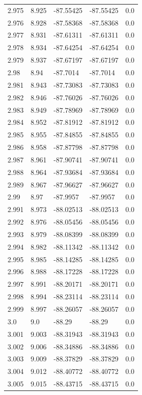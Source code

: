 \begin{tabular}{lllll}
2.975 & 8.925 & -87.55425 & -87.55425 & 0.0 \\
2.976 & 8.928 & -87.58368 & -87.58368 & 0.0 \\
2.977 & 8.931 & -87.61311 & -87.61311 & 0.0 \\
2.978 & 8.934 & -87.64254 & -87.64254 & 0.0 \\
2.979 & 8.937 & -87.67197 & -87.67197 & 0.0 \\
2.98 & 8.94 & -87.7014 & -87.7014 & 0.0 \\
2.981 & 8.943 & -87.73083 & -87.73083 & 0.0 \\
2.982 & 8.946 & -87.76026 & -87.76026 & 0.0 \\
2.983 & 8.949 & -87.78969 & -87.78969 & 0.0 \\
2.984 & 8.952 & -87.81912 & -87.81912 & 0.0 \\
2.985 & 8.955 & -87.84855 & -87.84855 & 0.0 \\
2.986 & 8.958 & -87.87798 & -87.87798 & 0.0 \\
2.987 & 8.961 & -87.90741 & -87.90741 & 0.0 \\
2.988 & 8.964 & -87.93684 & -87.93684 & 0.0 \\
2.989 & 8.967 & -87.96627 & -87.96627 & 0.0 \\
2.99 & 8.97 & -87.9957 & -87.9957 & 0.0 \\
2.991 & 8.973 & -88.02513 & -88.02513 & 0.0 \\
2.992 & 8.976 & -88.05456 & -88.05456 & 0.0 \\
2.993 & 8.979 & -88.08399 & -88.08399 & 0.0 \\
2.994 & 8.982 & -88.11342 & -88.11342 & 0.0 \\
2.995 & 8.985 & -88.14285 & -88.14285 & 0.0 \\
2.996 & 8.988 & -88.17228 & -88.17228 & 0.0 \\
2.997 & 8.991 & -88.20171 & -88.20171 & 0.0 \\
2.998 & 8.994 & -88.23114 & -88.23114 & 0.0 \\
2.999 & 8.997 & -88.26057 & -88.26057 & 0.0 \\
3.0 & 9.0 & -88.29 & -88.29 & 0.0 \\
3.001 & 9.003 & -88.31943 & -88.31943 & 0.0 \\
3.002 & 9.006 & -88.34886 & -88.34886 & 0.0 \\
3.003 & 9.009 & -88.37829 & -88.37829 & 0.0 \\
3.004 & 9.012 & -88.40772 & -88.40772 & 0.0 \\
3.005 & 9.015 & -88.43715 & -88.43715 & 0.0 \\

\end{tabular}

